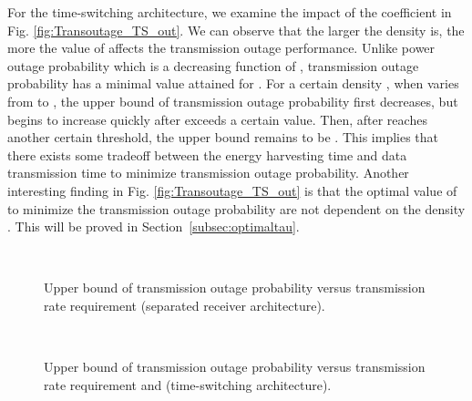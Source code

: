 \documentclass[12pt,draftclsnofoot,onecolumn]{IEEEtran}
\begin{document}
For the time-switching architecture, we examine the impact of the coefficient  in Fig. \ref{fig:Transoutage_TS_out}. We can observe that the larger the density  is, the more the value of  affects the transmission outage performance. Unlike power outage probability which is a decreasing function of , transmission outage probability has a minimal value attained for . For a certain density , when  varies from  to , the upper bound of transmission outage probability first decreases, but begins to increase quickly after  exceeds a certain value. Then, after  reaches another certain threshold, the upper bound remains to be . This implies that there exists some tradeoff between the energy harvesting time and data transmission time to minimize transmission outage probability. Another interesting finding in Fig. \ref{fig:Transoutage_TS_out} is that the optimal value of  to minimize the transmission outage probability are not dependent on the density . This will be proved in Section~\ref{subsec:optimaltau}.

\begin{figure} 
\centering
{} 
\centering
{} \\
\centering
\caption{Upper bound of transmission outage probability versus transmission rate requirement (separated receiver architecture).}
\label{fig:transoutage_rate}
\end{figure}  
    

\begin{figure} 
\centering
{} 
\centering
{} \\
\centering
\caption{Upper bound of transmission outage probability versus transmission rate requirement and  (time-switching architecture).}
\label{fig:trans_outage_alpha}
\end{figure}
    
\end{document}
